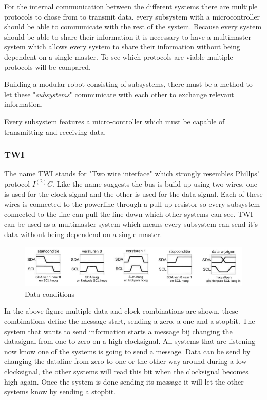 \documentclass[10pt,a4paper]{article}
\begin{document}
For the internal communication between the different systems there are multiple protocols to chose from to transmit data. every subsystem with a microcontroller should be able to communicate with the rest of the system. Because every system should be able to share their information it is necessary to have a multimaster system which allows every system to share their information without being dependent on a single master. To see which protocols are viable multiple protocols will be compared.

Building a modular robot consisting of subsystems, there must be a method to let these "\textit{subsystems}" communicate with each other to exchange relevant information. 

Every subsystem features a micro-controller which must be capable of transmitting and receiving data.  

\subsubsection{TWI}
The name TWI stands for "Two wire interface" which strongly resembles Phillps' protocol $I^(2)C$. Like the name suggests the bus is build up using two wires, one is used for the clock signal and the other is used for the data signal. Each of these wires is connected to the powerline through a pull-up resistor so every subsystem connected to the line can pull the line down which other systems can see. TWI can be used as a multimaster system which means every subsystem can send it's data without being dependend on a single master.



\begin{figure}[H]
        \centering
        \graphicspath{ {./images/} }
        \includegraphics[scale=.6]{datacondities}
        \caption{Data conditions}
        \label{fig:Data conditions}
\end{figure}
In the above figure multiple data and clock combinations are shown, these combinations define the message start, sending a zero, a one and a stopbit. The system that wants to send information starts a message bij changing the datasignal from one to zero on a high clocksignal. All systems that are listening now know one of the systems is going to send a message. Data can be send by changing the dataline from zero to one or the other way around during a low clocksignal, the other systems will read this bit when the clocksignal becomes high again. Once the system is done sending its message it will let the other systems know by sending a stopbit.
\end{document}
